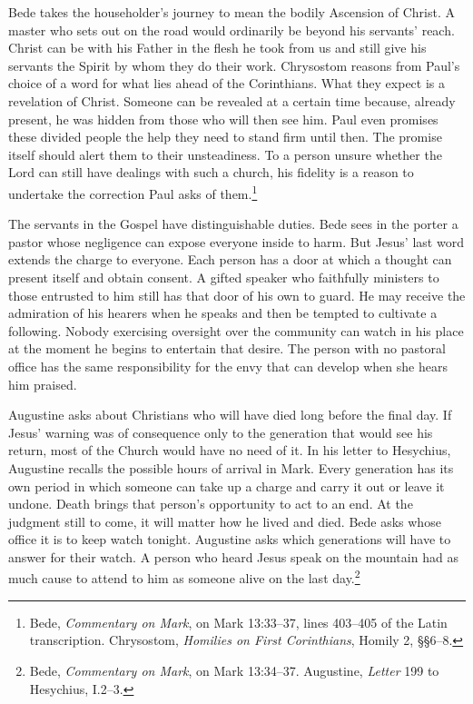 Bede takes the householder's journey to mean the bodily Ascension of Christ. A master who sets out on the road would ordinarily be beyond his servants' reach. Christ can be with his Father in the flesh he took from us and still give his servants the Spirit by whom they do their work. Chrysostom reasons from Paul's choice of a word for what lies ahead of the Corinthians. What they expect is a revelation of Christ. Someone can be revealed at a certain time because, already present, he was hidden from those who will then see him. Paul even promises these divided people the help they need to stand firm until then. The promise itself should alert them to their unsteadiness. To a person unsure whether the Lord can still have dealings with such a church, his fidelity is a reason to undertake the correction Paul asks of them.\footnote{Bede, \textit{Commentary on Mark}, on Mark 13:33--37, lines 403--405 of the Latin transcription. Chrysostom, \textit{Homilies on First Corinthians}, Homily 2, §§6--8.}

The servants in the Gospel have distinguishable duties. Bede sees in the porter a pastor whose negligence can expose everyone inside to harm. But Jesus' last word extends the charge to everyone. Each person has a door at which a thought can present itself and obtain consent. A gifted speaker who faithfully ministers to those entrusted to him still has that door of his own to guard. He may receive the admiration of his hearers when he speaks and then be tempted to cultivate a following. Nobody exercising oversight over the community can watch in his place at the moment he begins to entertain that desire. The person with no pastoral office has the same responsibility for the envy that can develop when she hears him praised.

Augustine asks about Christians who will have died long before the final day. If Jesus' warning was of consequence only to the generation that would see his return, most of the Church would have no need of it. In his letter to Hesychius, Augustine recalls the possible hours of arrival in Mark. Every generation has its own period in which someone can take up a charge and carry it out or leave it undone. Death brings that person's opportunity to act to an end. At the judgment still to come, it will matter how he lived and died. Bede asks whose office it is to keep watch tonight. Augustine asks which generations will have to answer for their watch. A person who heard Jesus speak on the mountain had as much cause to attend to him as someone alive on the last day.\footnote{Bede, \textit{Commentary on Mark}, on Mark 13:34--37. Augustine, \textit{Letter} 199 to Hesychius, I.2--3.}

